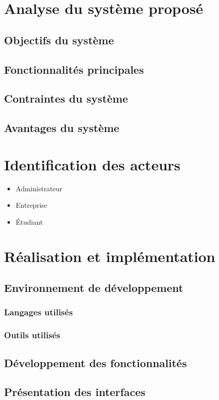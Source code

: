 \documentclass[12pt,a4paper,oneside]{memoir}
\begin{document}
	\section{Analyse du système proposé}
	\subsection{Objectifs du système}
	\subsection{Fonctionnalités principales}
	\subsection{Contraintes du système}
	\subsection{Avantages du système}
	\section{Identification des acteurs}
	\begin{itemize}
		\item Administrateur
		\item Entreprise
		\item Étudiant
	\end{itemize}
	\section{Réalisation et implémentation}
	\subsection{Environnement de développement}
	\subsubsection{Langages utilisés}
	\subsubsection{Outils utilisés}
	\subsection{Développement des fonctionnalités}
	\subsection{Présentation des interfaces}
\end{document}
